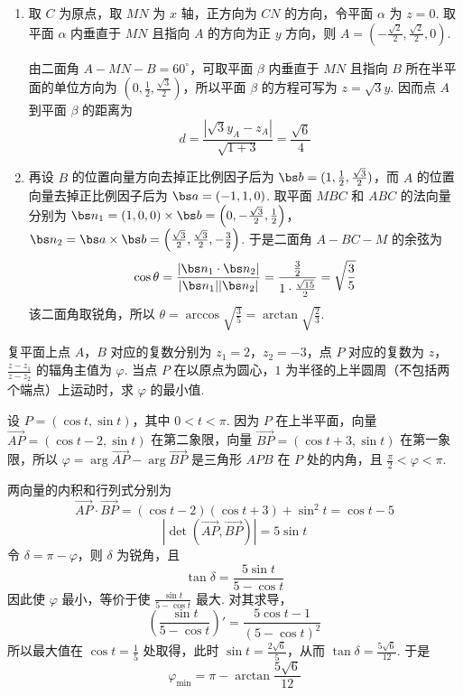 \begin{solution}
\begin{enumerate}
\item
取 \(C\) 为原点，取 \(MN\) 为 \(x\) 轴，正方向为 \(CN\) 的方向，令平面 \(\alpha\) 为 \(z=0\). 取平面 \(\alpha\) 内垂直于 \(MN\) 且指向 \(A\) 的方向为正 \(y\) 方向，则
\(A=(-\frac{\sqrt2}{2},\frac{\sqrt2}{2},0)\).

由二面角 \(A-MN-B=60^\circ\)，可取平面 \(\beta\) 内垂直于 \(MN\) 且指向 \(B\) 所在半平面的单位方向为 \((0,\frac12,\frac{\sqrt3}{2})\)，所以平面 \(\beta\) 的方程可写为 \(z=\sqrt3y\). 因而点 \(A\) 到平面 \(\beta\) 的距离为
\[
d=\frac{|\sqrt3y_A-z_A|}{\sqrt{1+3}}=\frac{\sqrt6}{4}
\]

\item
再设 \(B\) 的位置向量方向去掉正比例因子后为 \(\bs b=(1,\frac12,\frac{\sqrt3}{2})\)，而 \(A\) 的位置向量去掉正比例因子后为 \(\bs a=(-1,1,0)\). 取平面 \(MBC\) 和 \(ABC\) 的法向量分别为
\(\bs n_1=(1,0,0)\times\bs b=\left(0,-\frac{\sqrt3}{2},\frac12\right)\)，
\(\bs n_2=\bs a\times\bs b=\left(\frac{\sqrt3}{2},\frac{\sqrt3}{2},-\frac32\right)\).
于是二面角 \(A-BC-M\) 的余弦为
\[
\cos\theta=\frac{|\bs n_1\cdot\bs n_2|}{|\bs n_1||\bs n_2|}=\frac{\frac32}{1\cdot\frac{\sqrt{15}}2}=\sqrt{\frac35}
\]
该二面角取锐角，所以
\(\theta=\arccos\sqrt{\frac35}=\arctan\sqrt{\frac23}\).
\end{enumerate}
\end{solution}

\begin{problem}
复平面上点 \(A\)，\(B\) 对应的复数分别为 \(z_1=2\)，\(z_2=-3\)，点 \(P\) 对应的复数为 \(z\)，\(\frac{z-z_1}{z-z_2}\) 的辐角主值为 \(\varphi\). 当点 \(P\) 在以原点为圆心，\(1\) 为半径的上半圆周（不包括两个端点）上运动时，求 \(\varphi\) 的最小值.
\end{problem}

\begin{solution}
设 \(P=(\cos t,\sin t)\)，其中 \(0<t<\pi\). 因为 \(P\) 在上半平面，向量 \(\overrightarrow{AP}=(\cos t-2,\sin t)\) 在第二象限，向量 \(\overrightarrow{BP}=(\cos t+3,\sin t)\) 在第一象限，所以
\(\varphi=\arg\overrightarrow{AP}-\arg\overrightarrow{BP}\) 是三角形 \(APB\) 在 \(P\) 处的内角，且 \(\frac\pi2<\varphi<\pi\).

两向量的内积和行列式分别为
\[
\overrightarrow{AP}\cdot\overrightarrow{BP}=(\cos t-2)(\cos t+3)+\sin^2t=\cos t-5
\]
\[
\left|\det(\overrightarrow{AP},\overrightarrow{BP})\right|=5\sin t
\]
令 \(\delta=\pi-\varphi\)，则 \(\delta\) 为锐角，且
\[
\tan\delta=\frac{5\sin t}{5-\cos t}
\]
因此使 \(\varphi\) 最小，等价于使 \(\frac{\sin t}{5-\cos t}\) 最大. 对其求导，
\[
\left(\frac{\sin t}{5-\cos t}\right)'=\frac{5\cos t-1}{(5-\cos t)^2}
\]
所以最大值在 \(\cos t=\frac15\) 处取得，此时 \(\sin t=\frac{2\sqrt6}{5}\)，从而
\(\tan\delta=\frac{5\sqrt6}{12}\). 于是
\[
\varphi_{\min}=\pi-\arctan\frac{5\sqrt6}{12}
\]
\end{solution}
